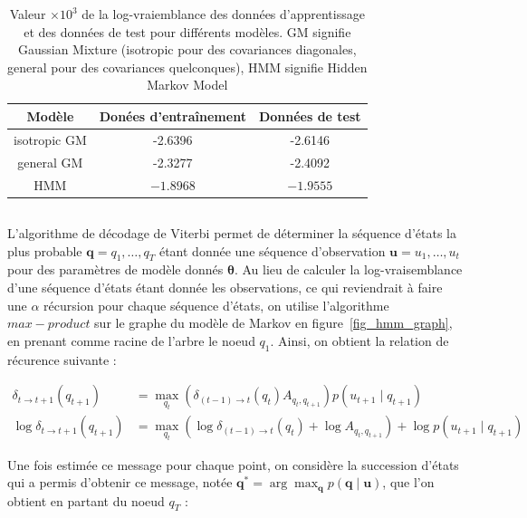 \documentclass[12pt,a4paper,onecolumn]{article}
\begin{document}
\begin{table}
	\centering
	\begin{tabular}{*{3}{c}}
		\toprule
		Modèle       & Donées d'entraînement & Données de test  \\
		\midrule
		isotropic GM & -2.6396               & -2.6146          \\
		general GM   & -2.3277               & -2.4092          \\
		HMM          & \(\bm{-1.8968}\)      & \(\bm{-1.9555}\) \\
		\bottomrule
	\end{tabular}
	\caption{Valeur \(\times10^3\) de la log-vraiemblance des données d'apprentissage et des données de test pour différents modèles. GM signifie Gaussian Mixture (isotropic pour des covariances diagonales, general pour des covariances quelconques), HMM signifie Hidden Markov Model}
	\label{tab_6_llh}
\end{table}

\subsection{}

L'algorithme de décodage de Viterbi permet de déterminer la séquence d'états la plus probable  \(\bm{q} = q_1,\dots,q_T\) étant donnée une séquence d'observation \(\bm{u} = u_1,\dots,u_t\) pour des paramètres de modèle donnés \(\bm{\theta}\). Au lieu de calculer la log-vraisemblance d'une séquence d'états étant donnée les observations, ce qui reviendrait à faire une \(\alpha\) récursion pour chaque séquence d'états, on utilise l'algorithme \(max-product\) sur le graphe du modèle de Markov en figure~\ref{fig_hmm_graph}, en prenant comme racine de l'arbre le noeud \(q_1\). Ainsi, on obtient la relation de récurence suivante :

\begin{align}
	\delta_{t\rightarrow t+1}(q_{t+1})      & = \max_{q_t}\left(\delta_{(t-1)\rightarrow t}(q_t) A_{q_t,q_{t+1}} \right) p(u_{t+1} \mid q_{t+1})                    \\
	\log \delta_{t\rightarrow t+1}(q_{t+1}) & = \max_{q_t}\left(\log \delta_{(t-1)\rightarrow t}(q_t) + \log A_{q_t,q_{t+1}} \right) + \log p(u_{t+1} \mid q_{t+1})
\end{align}

Une fois estimée ce message pour chaque point, on considère la succession d'états qui a permis d'obtenir ce message, notée \(\bm{q}^* = \operatorname{arg}\max_{\bm{q}} p(\bm{q} \mid \bm{u})\), que l'on obtient en partant du noeud \(q_T\) :
\end{document}
